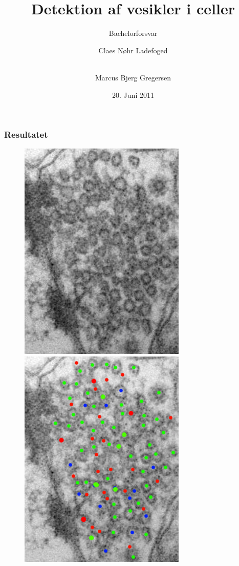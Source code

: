 \documentclass[12pt,t]{beamer}
\title{Detektion af vesikler i celler}
\subtitle{Bachelorforsvar}
\author{Claes Nøhr Ladefoged \and \\
Marcus Bjerg Gregersen}
\institute{Datalogisk Institut}
\date[]{20. Juni 2011}
\begin{document}
\frame[plain]{\titlepage}
\begin{frame}
\frametitle{Resultatet}
\begin{figure}[H]
	\centering
	\begin{minipage}[b]{0.49\linewidth}
		\includegraphics[scale=0.4]{img/ves/0.jpg}
	\end{minipage}
	\begin{minipage}[b]{0.49\linewidth}
		\includegraphics[scale=0.4]{img/ves/1_2.png}
	\end{minipage}
\end{figure}
\end{frame}
\end{document}
